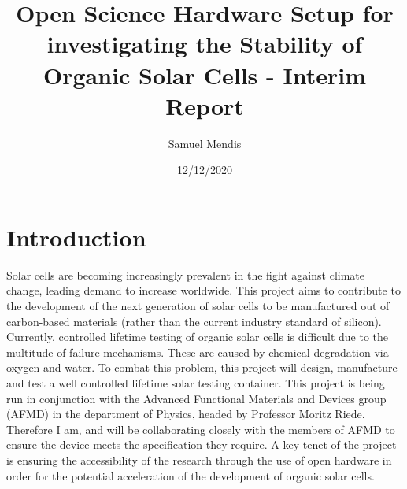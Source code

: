 \documentclass[a4paper,11pt]{article}
\begin{document}
\title{Open Science Hardware Setup for investigating the Stability of Organic Solar Cells - Interim Report}
\author{Samuel Mendis}
\date{12/12/2020}
\maketitle
\pagebreak
\section{Introduction}
Solar cells are becoming increasingly prevalent in the fight against climate change\cite[p.~34]{RN49}, leading demand to increase worldwide. This project aims to contribute to the development of the next generation of solar cells to be manufactured out of carbon-based materials (rather than the current industry standard of silicon). Currently, controlled lifetime testing of organic solar cells is difficult due to the multitude of failure mechanisms. These are caused by chemical degradation via oxygen and water\cite[p.~689]{RN38}. To combat this problem, this project will design, manufacture and test a well controlled lifetime solar testing container. This project is being run in conjunction with the Advanced Functional Materials and Devices group (AFMD) in the department of Physics, headed by Professor Moritz Riede. Therefore I am, and will be collaborating closely with the members of AFMD to ensure the device meets the specification they require. A key tenet of the project is ensuring the accessibility of the research through the use of open hardware in order for the  potential acceleration of the development of organic solar cells.
\end{document}
